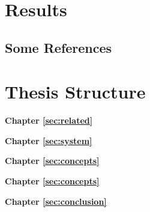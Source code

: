 \Blindtext[3][1] \cite{Jurgens:2000,Jurgens:1995,Miede:2011,Kohm:2011,Apple:keynote:2010,Apple:numbers:2010,Apple:pages:2010}

\section{Results}
\label{sec:intro:results}

\Blindtext[1][2]

\subsection{Some References}
\label{sec:intro:results:refs}
\cite{WEB:GNU:GPL:2010,WEB:Miede:2011}

\section{Thesis Structure}
\label{sec:intro:structure}

\textbf{Chapter \ref{sec:related}} \\[0.2em]
\blindtext

\textbf{Chapter \ref{sec:system}} \\[0.2em]
\blindtext

\textbf{Chapter \ref{sec:concepts}} \\[0.2em]
\blindtext

\textbf{Chapter \ref{sec:concepts}} \\[0.2em]
\blindtext

\textbf{Chapter \ref{sec:conclusion}} \\[0.2em]
\blindtext
